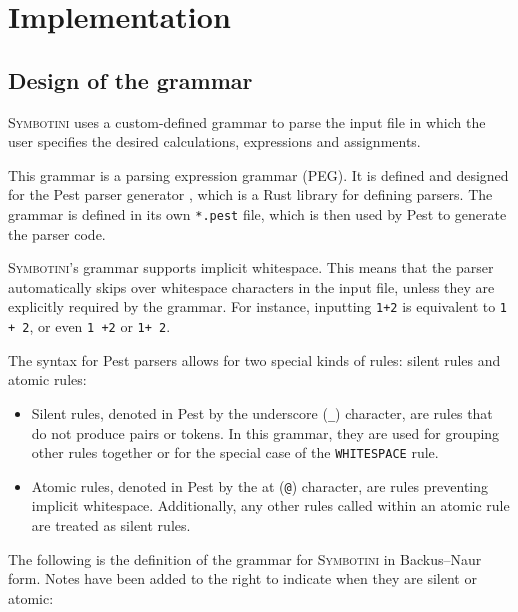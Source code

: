\chapter{Implementation}\label{chap:implementation}

\lstset{language=Rust, style=colouredRust, numbers=none}

\section{Design of the grammar}\label{sec:design-of-the-grammar}

\textsc{Symbotini} uses a custom-defined grammar to parse the input file in which the user specifies the desired calculations, expressions and assignments.

This grammar is a parsing expression grammar (PEG). It is defined and designed for the Pest parser generator \parencite{pest-book}, which is a Rust library for defining parsers. The grammar is defined in its own \verb|*.pest| file, which is then used by Pest to generate the parser code.

\textsc{Symbotini}'s grammar supports implicit whitespace. This means that the parser automatically skips over whitespace characters in the input file, unless they are explicitly required by the grammar. For instance, inputting \verb|1+2| is equivalent to \verb|1 + 2|, or even \verb|1 +2| or \verb|1+ 2|.

The syntax for Pest parsers allows for two special kinds of rules: silent rules and atomic rules:

\begin{itemize}
    \item Silent rules, denoted in Pest by the underscore (\verb|_|) character, are rules that do not produce pairs or tokens. In this grammar, they are used for grouping other rules together or for the special case of the \verb|WHITESPACE| rule.
    \item Atomic rules, denoted in Pest by the at (\verb|@|) character, are rules preventing implicit whitespace. Additionally, any other rules called within an atomic rule are treated as silent rules.
\end{itemize}

The following is the definition of the grammar for \textsc{Symbotini} in Backus--Naur form. Notes have been added to the right to indicate when they are silent or atomic:

